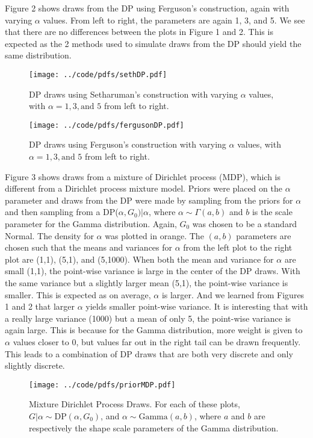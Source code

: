 \documentclass{article}
\def\beginmyfig{\begin{figure}[htbp]\begin{center}}
\def\endmyfig{\end{center}\end{figure}}
\begin{document}
\noindent
Figure 2 shows draws from the DP using Ferguson's construction, again with
varying $\alpha$ values.  From left to right, the parameters are again 1, 3,
and 5. We see that there are no differences between the plots in Figure 1 and
2. This is expected as the 2 methods used to simulate draws from the DP should
yield the same distribution.

\vspace{5em}
\beginmyfig
  \texttt{[image: ../code/pdfs/sethDP.pdf]}
  \caption{DP draws using Setharuman's construction with varying $\alpha$
  values, with $\alpha=1, 3, \text{and } 5$ from left to right.}
\endmyfig
\beginmyfig
  \texttt{[image: ../code/pdfs/fergusonDP.pdf]}
  \caption{DP draws using Ferguson's construction with varying $\alpha$
  values, with $\alpha=1, 3, \text{and } 5$ from left to right.}
\endmyfig

\noindent
Figure 3 shows draws from a mixture of Dirichlet process (MDP), which is
different from a Dirichlet process mixture model. Priors were placed on the
$\alpha$ parameter and draws from the DP were made by sampling from the priors
for $\alpha$ and then sampling from a DP($\alpha,G_0) | \alpha$, where $\alpha
\sim \Gamma(a,b)$ and $b$ is the scale parameter for the Gamma distribution.
Again, $G_0$ was chosen to be a standard Normal. The density for $\alpha$ was
plotted in orange. The $(a,b)$ parameters are chosen such that the means and
variances for $\alpha$ from the left plot to the right plot are (1,1), (5,1),
and (5,1000). When both the mean and variance for $\alpha$ are small (1,1), the
point-wise variance is large in the center of the DP draws. With the same
variance but a slightly larger mean (5,1), the point-wise variance is smaller.
This is expected as on average, $\alpha$ is larger. And we learned from Figures
1 and 2 that larger $\alpha$ yields smaller point-wise variance. It is
interesting that with a really large variance (1000) but a mean of only 5, the
point-wise variance is again large. This is because for the Gamma distribution,
more weight is given to $\alpha$ values closer to 0, but values far out in the
right tail can be drawn frequently. This leads to a combination of DP draws
that are both very discrete and only slightly discrete.
\beginmyfig
  \texttt{[image: ../code/pdfs/priorMDP.pdf]}
  \caption{Mixture Dirichlet Process Draws. For each of these plots, 
  $G|\alpha \sim \text{DP}(\alpha,G_0)$, and $\alpha \sim \text{Gamma}(a,b)$,
  where $a$ and $b$ are respectively the shape scale parameters of the 
  Gamma distribution.}
\endmyfig
\end{document}
